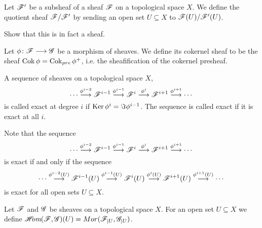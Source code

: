 \begin{definition}
Let $\mathscr{F}'$ be a subsheaf of a sheaf $\mathscr{F}$ on a topological space $X$. We define the quotient sheaf $\mathscr{F}/\mathscr{F}'$ by sending an open set $U\subseteq X$ to $\mathscr{F}(U)/\mathscr{F}'(U)$. 
\end{definition}
\begin{problem}
Show that this is in fact a sheaf.
\end{problem}

\begin{definition}
Let $\phi\colon\mathscr{F}\longrightarrow\mathscr{G}$ be a morphism of sheaves. We define its cokernel sheaf to be the sheaf $\operatorname{Cok}\phi = \operatorname{Cok}_{pre}\phi^+$, i.e. the sheafification of the cokernel presheaf. 
\end{definition}

\begin{definition}
A sequence of sheaves on a topological space $X$,
\begin{equation*}
    \cdots \overset{\phi^{i-2}}\longrightarrow \mathscr{F}^{i-1}\overset{\phi^{i-1}}\longrightarrow \mathscr{F}^i\overset{\phi^i}\longrightarrow \mathscr{F}^{i+1}\overset{\phi^{i+1}}\longrightarrow\cdots
\end{equation*}
is called exact at degree $i$ if $\operatorname{Ker}\phi^{i} = \Im\phi^{i-1}$. The sequence is called exact if it is exact at all $i$. 
\end{definition}

Note that the sequence 
\begin{equation*}
    \cdots \overset{\phi^{i-2}}\longrightarrow \mathscr{F}^{i-1}\overset{\phi^{i-1}}\longrightarrow \mathscr{F}^i\overset{\phi^i}\longrightarrow \mathscr{F}^{i+1}\overset{\phi^{i+1}}\longrightarrow\cdots
\end{equation*}
is exact if and only if the sequence 
\begin{equation*}
    \cdots \overset{\phi^{i-2}(U)}\longrightarrow \mathscr{F}^{i-1}(U)\overset{\phi^{i-1}(U)}\longrightarrow \mathscr{F}^i(U)\overset{\phi^i(U)}\longrightarrow \mathscr{F}^{i+1}(U)\overset{\phi^{i+1}(U)}\longrightarrow\cdots
\end{equation*}
is exact for all open sets $U\subseteq X$.

\begin{definition}
Let $\mathscr{F}$ and $\mathscr{G}$ be sheaves on a topological space $X$. For an open set $U\subseteq X$ we define $\mathscr{H}\hspace{-1mm}\textit{om}(\mathscr{F}, \mathscr{G})(U) = Mor(\mathscr{F}_{\vert U}, \mathscr{G}_{\vert U})$. 
\end{definition}

